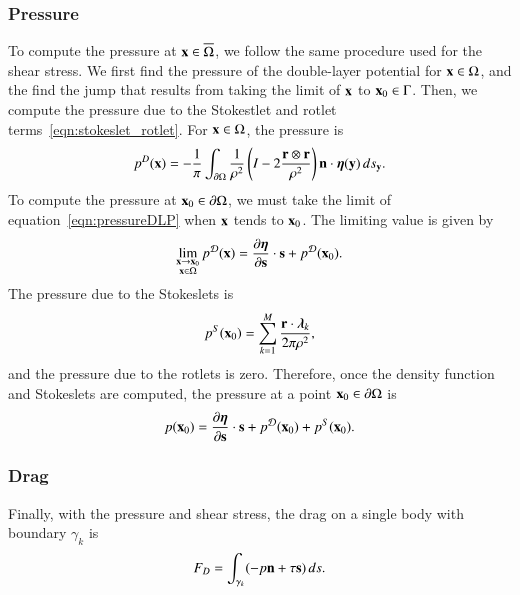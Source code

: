 \documentclass[preprint, 10pt]{elsarticle}
\begin{document}
\subsubsection{Pressure}
To compute the pressure at ${\mathbf{x}} \in \overline{\Omega}$, we follow the
same procedure used for the shear stress.  We first find the pressure of
the double-layer potential for ${\mathbf{x}} \in \Omega$, and the find the jump
that results from taking the limit of ${\mathbf{x}}$ to ${\mathbf{x}}_0 \in \Gamma$.
Then, we compute the pressure due to the Stokestlet and rotlet
terms~\eqref{eqn:stokeslet_rotlet}.   For ${\mathbf{x}} \in \Omega$,
the pressure is
\begin{align}
  p^{D}({\mathbf{x}}) = -\frac{1}{\pi}\int_{{\partial}\Omega} \frac{1}{\rho^2}
    \left(I - 2 \frac{{\mathbf{r}} \otimes {\mathbf{r}}}{\rho^2}\right) 
    {\mathbf{n}} \cdot {\boldsymbol\eta}({\mathbf{y}}) \,ds_{\mathbf{y}}.
  \label{eqn:pressureDLP}
\end{align}
To compute the pressure at ${\mathbf{x}}_0 \in {\partial}\Omega$, we must take the limit
of equation~\eqref{eqn:pressureDLP} when ${\mathbf{x}}$ tends to ${\mathbf{x}}_0$.  The
limiting value is given by~\cite{qua-bir2014a}
\begin{align}
  \lim_{\substack{{\mathbf{x}} \rightarrow {\mathbf{x}}_0 \\ {\mathbf{x}} \in \Omega}}p^{\mathcal{D}}({\mathbf{x}}) =  
    \frac{\partial {\boldsymbol\eta}}{\partial {\mathbf{s}}} \cdot {\mathbf{s}} + p^{{\mathcal{D}}}({\mathbf{x}}_0).
  \label{eqn:pressureDLPdiag}
\end{align}
The pressure due to the Stokeslets is
\begin{align*}
  p^S({\mathbf{x}}_0) = \sum_{k=1}^{M}\frac{{\mathbf{r}} \cdot {\boldsymbol\lambda}_k}{2\pi\rho^2},
\end{align*}
and the pressure due to the rotlets is zero.  Therefore, once the
density function and Stokeslets are computed, the pressure at a point
${\mathbf{x}}_0 \in {\partial}\Omega$ is
\begin{align*}
  p({\mathbf{x}}_0) = \frac{\partial {\boldsymbol\eta}}{\partial {\mathbf{s}}} \cdot {\mathbf{s}} + p^{{\mathcal{D}}}({\mathbf{x}}_0) + 
              p^{S}({\mathbf{x}}_0).
\end{align*}

\subsubsection{Drag}
Finally, with the pressure and shear stress, the drag on a single body
with boundary $\gamma_k$ is
\begin{align}
  F_D = \int_{\gamma_k} (-p {\mathbf{n}} + \tau {\mathbf{s}})\,ds.
  \label{eqn:drag}
\end{align}
\end{document}
